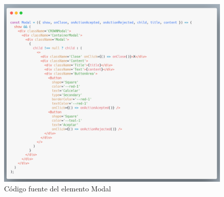 \newline
    \newline
    \begin{figure}[H]
    \centering
    \includegraphics[width=1\textwidth]{./Imagenes/8.38.png}
    \caption[Código fuente del elemento Modal]{Código fuente del elemento Modal}
    \end{figure}
    \clearpage
